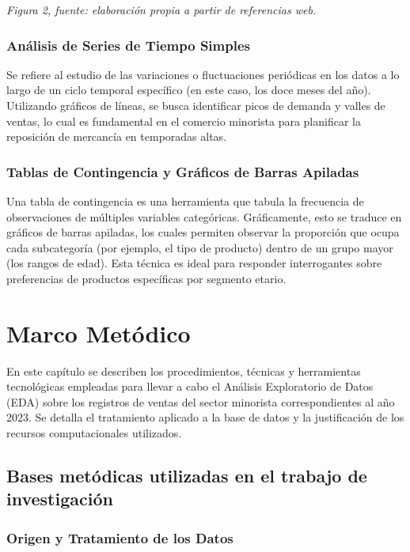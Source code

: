 \documentclass[oneside,11pt]{Latex/Classes/PhDthesisPSnPDF}
\begin{document}
\begin{center}
\small \textit{Figura 2, fuente: elaboración propia a partir de referencias web.}
\end{center}

\subsection{Análisis de Series de Tiempo Simples}

Se refiere al estudio de las variaciones o fluctuaciones periódicas en
los datos a lo largo de un ciclo temporal específico (en este caso, los
doce meses del año). Utilizando gráficos de líneas, se busca identificar
picos de demanda y valles de ventas, lo cual es fundamental en el
comercio minorista para planificar la reposición de mercancía en
temporadas altas.

\subsection{Tablas de Contingencia y Gráficos de Barras Apiladas}

Una tabla de contingencia es una herramienta que tabula la frecuencia de
observaciones de múltiples variables categóricas. Gráficamente, esto se
traduce en gráficos de barras apiladas, los cuales permiten observar la
proporción que ocupa cada subcategoría (por ejemplo, el tipo de
producto) dentro de un grupo mayor (los rangos de edad). Esta técnica es
ideal para responder interrogantes sobre preferencias de productos
específicas por segmento etario.

\chapter{Marco Metódico}

En este capítulo se describen los procedimientos, técnicas y
herramientas tecnológicas empleadas para llevar a cabo el Análisis
Exploratorio de Datos (EDA) sobre los registros de ventas del sector
minorista correspondientes al año 2023. Se detalla el tratamiento
aplicado a la base de datos y la justificación de los recursos
computacionales utilizados.

\section{Bases metódicas utilizadas en el trabajo de investigación}

\subsection{Origen y Tratamiento de los Datos}
\end{document}

